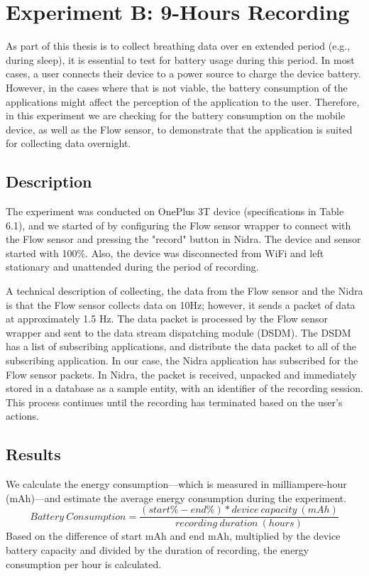 \section{Experiment B: 9-Hours Recording}
As part of this thesis is to collect breathing data over en extended period (e.g., during sleep), it is essential to test for battery usage during this period. In most cases, a user connects their device to a power source to charge the device battery. However, in the cases where that is not viable, the battery consumption of the applications might affect the perception of the application to the user. Therefore, in this experiment we are checking for the battery consumption on the mobile device, as well as the Flow sensor, to demonstrate that the application is suited for collecting data overnight.

\subsection{Description}
The experiment was conducted on OnePlus 3T device (specifications in Table 6.1), and we started of by configuring the Flow sensor wrapper to connect with the Flow sensor and pressing the "record" button in Nidra. The device and sensor started with 100\%. Also, the device was disconnected from WiFi and left stationary and unattended during the period of recording.  

A technical description of collecting, the data from the Flow sensor and the Nidra is that the Flow sensor collects data on 10Hz; however, it sends a packet of data at approximately 1.5 Hz. The data packet is processed by the Flow sensor wrapper and sent to the data stream dispatching module (DSDM). The DSDM has a list of subscribing applications, and distribute the data packet to all of the subscribing application. In our case, the Nidra application has subscribed for the Flow sensor packets. In Nidra, the packet is received, unpacked and immediately stored in a database as a sample entity, with an identifier of the recording session. This process continues until the recording has terminated based on the user's actions.

\subsection{Results}

We calculate the energy consumption---which is measured in milliampere-hour (mAh)---and estimate the average energy consumption during the experiment. 
\begin{equation} \label{losscount}
Battery\ Consumption = \frac{(start\% - end\%) * device\ capacity\ (mAh)}{recording\ duration\ (hours)}
\end{equation}
Based on the difference of start mAh and end mAh, multiplied by the device battery capacity and divided by the duration of recording, the energy consumption per hour is calculated. 

